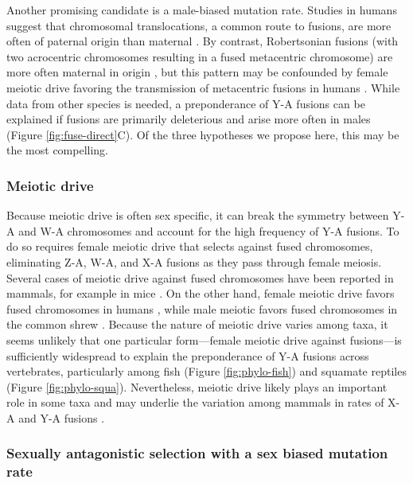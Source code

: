 Another promising candidate is a male-biased mutation rate. Studies in humans suggest that chromosomal translocations, a common route to fusions, are more often of paternal origin than maternal \citep{Batista1993, Thomas2010, Grossmann2010}. By contrast, Robertsonian fusions (with two acrocentric chromosomes resulting in a fused metacentric chromosome) are more often maternal in origin \citep{Chamberlin1980, Bandy2002}, but this pattern may be confounded by female meiotic drive favoring the transmission of metacentric fusions in humans \citep{Pardo2001a}. While data from other species is needed, a preponderance of Y-A fusions can be explained if fusions are primarily deleterious and arise more often in males (Figure \ref{fig:fuse-direct}C). Of the three hypotheses we propose here, this may be the most compelling.

\subsubsection{Meiotic drive}

Because meiotic drive is often sex specific, it can break the symmetry between Y-A and W-A chromosomes and account for the high frequency of Y-A fusions. To do so requires female meiotic drive that selects against fused chromosomes, eliminating Z-A, W-A, and X-A fusions as they pass through female meiosis. Several cases of meiotic drive against fused chromosomes have been reported in mammals, for example in mice \citep{Pardo2001a, Pardo2001b}. On the other hand, female meiotic drive favors fused chromosomes in humans \citep{Pardo2001a}, while male meiotic favors fused chromosomes in the common shrew \citep{Searle1986, Wyttenbach1997}. Because the nature of meiotic drive varies among taxa, it seems unlikely that one particular form---female meiotic drive against fusions---is sufficiently widespread to explain the preponderance of Y-A fusions across vertebrates, particularly among fish (Figure \ref{fig:phylo-fish}) and squamate reptiles (Figure \ref{fig:phylo-squa}). Nevertheless, meiotic drive likely plays an important role in some taxa and may underlie the variation among mammals in rates of X-A and Y-A fusions \citep{Yoshida2012}.

\subsubsection{Sexually antagonistic selection with a sex biased mutation rate}

